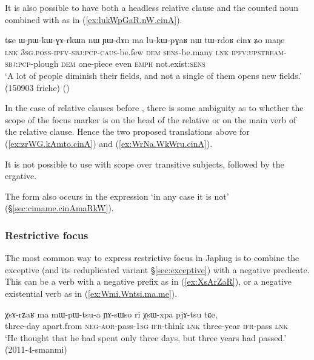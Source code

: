 It is also possible to have both a headless relative clause and the counted noun  combined with  as in (\ref{ex:lukWpGaR.nW.cinA}).

  \begin{exe}
\ex \label{ex:lukWpGaR.nW.cinA}
\gll tɕe ɯ-ɲɯ-kɯ-ɣɤ-rkɯn nɯ ɲɯ-dɤn ma lu-kɯ-pɣaʁ nɯ tɯ-rdoʁ cinɤ ʑo maŋe\\
\textsc{lnk} \textsc{3sg}.\textsc{poss}-\textsc{ipfv}-\textsc{sbj}:\textsc{pcp}-\textsc{caus}-be.few \textsc{dem} \textsc{sens}-be.many \textsc{lnk} \textsc{ipfv}:\textsc{upstream}-\textsc{sbj}:\textsc{pcp}-plough \textsc{dem} one-piece even \textsc{emph} not.exist:\textsc{sens}\\
\glt `A lot of people diminish their fields, and not a single of them opens new fields.' (150903 friche)
()
\end{exe}

In the case of relative clauses before , there is some ambiguity as to whether the scope of the focus marker is on the head of the relative or on the main verb of the relative clause. Hence the two proposed translations above for (\ref{ex:zrWG.kAmto.cinA}) and (\ref{ex:WrNa.WkWru.cinA}).

It is not possible to use  with scope over transitive subjects, followed by the ergative.

The form  also occurs in the expression  `in any case it is not' (§\ref{sec:cimame.cinAmaRkW}).


\subsubsection{Restrictive focus} \label{sec:restrictive.focus} 
 The most common way to express restrictive focus in Japhug is to combine the exceptive  (and its reduplicated variant  §\ref{sec:exceptive}) with a negative predicate. This can be a verb with a negative prefix as in (\ref{ex:XsArZaR}), or a negative existential verb as in (\ref{ex:Wmi.Wntsi.ma.me}).
 
 \begin{exe}
\ex  \label{ex:XsArZaR}
\gll   χsɤ-rʑaʁ ma mɯ-pɯ-tsu-a ɲɤ-sɯso ri χsɯ-xpa pjɤ-tsu tɕe,  \\
three-day apart.from \textsc{neg}-\textsc{aor}-pass-\textsc{1sg} \textsc{ifr}-think \textsc{lnk} three-year \textsc{ifr}-pass \textsc{lnk} \\
\glt `He thought that he had spent only three days, but three years had passed.' (2011-4-smanmi)
  \end{exe}
 
